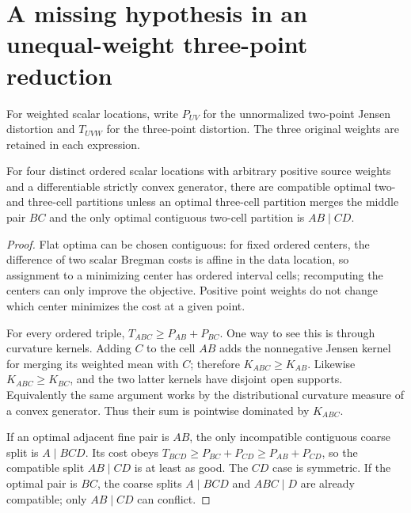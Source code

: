 \section{A missing hypothesis in an unequal-weight three-point reduction}

For weighted scalar locations, write $P_{UV}$ for the unnormalized
two-point Jensen distortion and $T_{UVW}$ for the three-point distortion.
The three original weights are retained in each expression.

\begin{proposition}
For four distinct ordered scalar locations with arbitrary positive source
weights and a differentiable strictly convex generator, there are
compatible optimal two- and three-cell partitions unless an optimal
three-cell partition merges the middle pair $BC$ and the only optimal
contiguous two-cell partition is $AB\mid CD$.
\end{proposition}
\begin{proof}
Flat optima can be chosen contiguous: for fixed ordered centers, the
difference of two scalar Bregman costs is affine in the data location, so
assignment to a minimizing center has ordered interval cells; recomputing
the centers can only improve the objective. Positive point weights do not
change which center minimizes the cost at a given point.

For every ordered triple, $T_{ABC}\geq P_{AB}+P_{BC}$. One way to see
this is through curvature kernels. Adding $C$ to the cell $AB$ adds the
nonnegative Jensen kernel for merging its weighted mean with $C$;
therefore $K_{ABC}\geq K_{AB}$. Likewise $K_{ABC}\geq K_{BC}$, and the
two latter kernels have disjoint open supports. Equivalently the same
argument works by the distributional curvature measure of a convex
generator. Thus their sum is pointwise dominated by $K_{ABC}$.

If an optimal adjacent fine pair is $AB$, the only incompatible
contiguous coarse split is $A\mid BCD$. Its cost obeys
$T_{BCD}\geq P_{BC}+P_{CD}\geq P_{AB}+P_{CD}$, so the compatible split
$AB\mid CD$ is at least as good. The $CD$ case is symmetric.
If the optimal pair is $BC$, the coarse splits $A\mid BCD$ and
$ABC\mid D$ are already compatible; only $AB\mid CD$ can conflict.
\end{proof}

